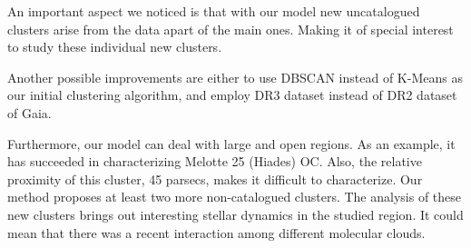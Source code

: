 \documentclass[11pt,a4paper,english,twocolumn]{article}
\begin{document}
An important aspect we noticed is that with our model new uncatalogued clusters arise from the data apart of the main
ones. Making it of special interest to study these individual new clusters.

Another possible improvements are either to use DBSCAN instead of K-Means as our initial clustering algorithm, and
employ DR3 dataset instead of DR2 dataset of Gaia.

Furthermore, our model can deal with large and open regions. As an example, it has succeeded in characterizing Melotte
25 (Hiades) OC. Also, the relative proximity of this cluster, 45 parsecs, makes it difficult to characterize. Our method
proposes at least two more non-catalogued clusters. The analysis of these new clusters brings out interesting stellar
dynamics in the studied region. It could mean that there was a recent interaction among different molecular clouds.

\renewcommand{\refname}{References}


\end{document}
